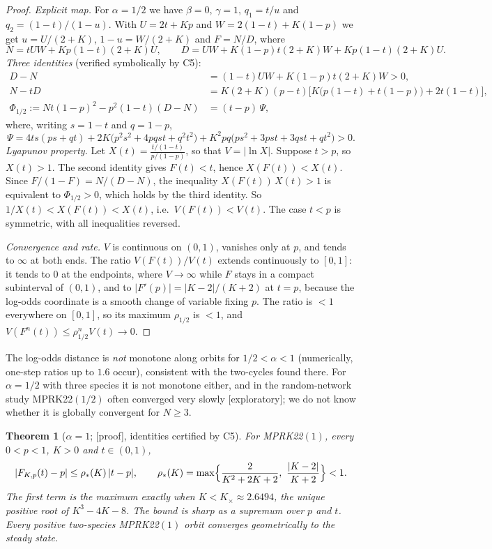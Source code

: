 \documentclass[11pt,a4paper]{article}
\theoremstyle{plain}
\newtheorem{theorem}{Theorem}
\theoremstyle{definition}
\newcommand{\status}[1]{\textsf{[#1]}}
\begin{document}
\begin{proof}
\emph{Explicit map.} For $\alpha=1/2$ we have $\beta=0$, $\gamma=1$, $q_1=t/u$ and $q_2=(1-t)/(1-u)$. With $U=2t+Kp$ and $W=2(1-t)+K(1-p)$ we get $u=U/(2+K)$, $1-u=W/(2+K)$ and $F=N/D$, where
\[
 N=tUW+Kp(1-t)(2+K)U,\qquad D=UW+K(1-p)t(2+K)W+Kp(1-t)(2+K)U .
\]
\emph{Three identities} (verified symbolically by C5):
\begin{align*}
 D-N&=(1-t)UW+K(1-p)t(2+K)W>0,\\
 N-tD&=K(2+K)(p-t)\bigl[K\bigl(p(1-t)+t(1-p)\bigr)+2t(1-t)\bigr],\\
 \Phi_{1/2}:=Nt(1-p)^2-p^2(1-t)(D-N)&=(t-p)\,\Psi,
\end{align*}
where, writing $s=1-t$ and $q=1-p$,
\[
 \Psi=4ts(ps+qt)+2K\bigl(p^2s^2+4pqst+q^2t^2\bigr)+K^2pq\bigl(ps^2+3pst+3qst+qt^2\bigr)>0 .
\]
\emph{Lyapunov property.} Let $X(t)=\frac{t/(1-t)}{p/(1-p)}$, so that $V=|\ln X|$. Suppose $t>p$, so $X(t)>1$. The second identity gives $F(t)<t$, hence $X(F(t))<X(t)$. Since $F/(1-F)=N/(D-N)$, the inequality $X(F(t))\,X(t)>1$ is equivalent to $\Phi_{1/2}>0$, which holds by the third identity. So $1/X(t)<X(F(t))<X(t)$, i.e.\ $V(F(t))<V(t)$. The case $t<p$ is symmetric, with all inequalities reversed.

\emph{Convergence and rate.} $V$ is continuous on $(0,1)$, vanishes only at $p$, and tends to $\infty$ at both ends. The ratio $V(F(t))/V(t)$ extends continuously to $[0,1]$: it tends to $0$ at the endpoints, where $V\to\infty$ while $F$ stays in a compact subinterval of $(0,1)$, and to $|F'(p)|=|K-2|/(K+2)$ at $t=p$, because the log-odds coordinate is a smooth change of variable fixing $p$. The ratio is $<1$ everywhere on $[0,1]$, so its maximum $\rho_{1/2}$ is $<1$, and $V(F^n(t))\le\rho_{1/2}^nV(t)\to0$.
\end{proof}

The log-odds distance is \emph{not} monotone along orbits for $1/2<\alpha<1$ (numerically, one-step ratios up to $1.6$ occur), consistent with the two-cycles found there. For $\alpha=1/2$ with three species it is not monotone either, and in the random-network study MPRK22$(1/2)$ often converged very slowly \status{exploratory}; we do not know whether it is globally convergent for $N\ge3$.

\begin{theorem}[$\alpha=1$; \status{proof}, identities certified by C5]\label{thm:alphaone}
For MPRK22$(1)$, every $0<p<1$, $K>0$ and $t\in(0,1)$,
\[
 |F_{K,p}(t)-p|\le\rho_*(K)\,|t-p|,\qquad \rho_*(K)=\max\Bigl\{\frac{2}{K^2+2K+2},\ \frac{|K-2|}{K+2}\Bigr\}<1 .
\]
The first term is the maximum exactly when $K<K_\times\approx2.6494$, the unique positive root of $K^3-4K-8$. The bound is sharp as a supremum over $p$ and $t$. Every positive two-species MPRK22$(1)$ orbit converges geometrically to the steady state.
\end{theorem}
\end{document}
